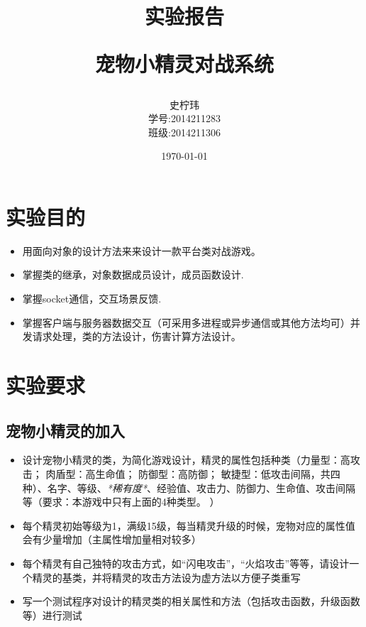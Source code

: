 \documentclass{article}
\begin{document}
\title{实验报告\\ [2ex] \begin{large}宠物小精灵对战系统 \end{large}}
\author{史柠玮\\
        学号:2014211283\\
        班级:2014211306}
\date{\today}

\maketitle
\tableofcontents

\pagebreak[4]




\section{实验目的}
\label{sec:purpose}
\begin{itemize}
\item 用面向对象的设计方法来来设计一款平台类对战游戏。 
\item 掌握类的继承，对象数据成员设计，成员函数设计.
\item 掌握socket通信，交互场景反馈.
\item 掌握客户端与服务器数据交互（可采用多进程或异步通信或其他方法均可）并发请求处理，类的方法设计，伤害计算方法设计。
\end{itemize}


\section{实验要求}
\label{sec:demand}

\subsection{宠物小精灵的加入}
  \begin{itemize}
  \item 设计宠物小精灵的类，为简化游戏设计，精灵的属性包括种类（力量型：高攻击； 肉盾型：高生命值； 防御型：高防御； 敏捷型：低攻击间隔，共四种）、名字、等级、\emph{*稀有度*}、经验值、攻击力、防御力、生命值、攻击间隔等（要求：本游戏中只有上面的4种类型。 ）
  \item 每个精灵初始等级为1，满级15级，每当精灵升级的时候，宠物对应的属性值会有少量增加（主属性增加量相对较多）
  \item 每个精灵有自己独特的攻击方式，如“闪电攻击”，“火焰攻击”等等，请设计一个精灵的基类，并将精灵的攻击方法设为虚方法以方便子类重写
  \item 写一个测试程序对设计的精灵类的相关属性和方法（包括攻击函数，升级函数等）进行测试
  \end{itemize}
\end{document}
